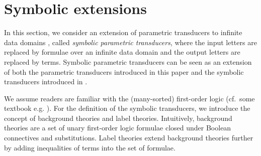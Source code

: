 
\section{Symbolic extensions}
\label{sec:symbolic}


In this section, we consider an extension of parametric transducers to infinite data domains , called \emph{symbolic parametric transducers}, where the input letters are replaced by formulae over an infinite data domain and the output letters are replaced by terms. 
%
Symbolic parametric transducers can be seen as an extension of both the parametric transducers introduced in this paper and the symbolic transducers introduced in \cite{VHLMB12}.

We assume readers are familiar with the (many-sorted) first-order logic (cf.\ some textbook e.g. \cite{EFT94}).
For the definition of the symbolic transducers, we introduce the concept of background theories and label theories. Intuitively, background theories are a set of unary first-order logic formulae closed under Boolean connectives and substitutions. Label theories extend background theories further by adding inequalities of terms into the set of formulae.


